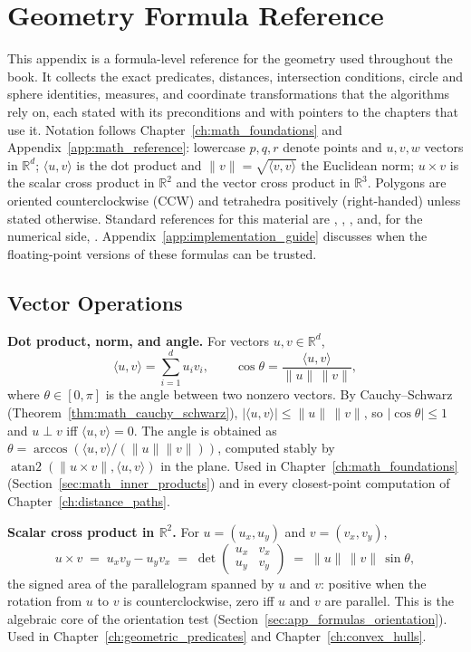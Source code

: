 \chapter{Geometry Formula Reference}
\label{app:geometry_formulas}

This appendix is a formula-level reference for the geometry used throughout
the book. It collects the exact predicates, distances, intersection
conditions, circle and sphere identities, measures, and coordinate
transformations that the algorithms rely on, each stated with its
preconditions and with pointers to the chapters that use it. Notation
follows Chapter~\ref{ch:math_foundations} and Appendix~\ref{app:math_reference}:
lowercase $p,q,r$ denote points and $u,v,w$ vectors in $\mathbb{R}^d$;
$\langle u,v\rangle$ is the dot product and $\|v\| = \sqrt{\langle v,v\rangle}$
the Euclidean norm; $u\times v$ is the scalar cross product in
$\mathbb{R}^2$ and the vector cross product in $\mathbb{R}^3$. Polygons are
oriented counterclockwise (CCW) and tetrahedra positively (right-handed)
unless stated otherwise. Standard references for this material are
\cite{deberg2008}, \cite{preparata1985}, \cite{weisstein2004}, and, for the
numerical side, \cite{higham2002}. Appendix~\ref{app:implementation_guide}
discusses when the floating-point versions of these formulas can be trusted.

\section{Vector Operations}
\label{sec:app_formulas_vectors}

\medskip\noindent\textbf{Dot product, norm, and angle.}
For vectors $u,v \in \mathbb{R}^d$,
\[
  \langle u, v\rangle = \sum_{i=1}^d u_i v_i,
  \qquad
  \cos\theta = \frac{\langle u,v\rangle}{\|u\|\,\|v\|},
\]
where $\theta \in [0,\pi]$ is the angle between two nonzero vectors. By
Cauchy--Schwarz (Theorem~\ref{thm:math_cauchy_schwarz}),
$|\langle u,v\rangle| \le \|u\|\,\|v\|$, so $|\cos\theta|\le 1$ and
$u \perp v$ iff $\langle u,v\rangle = 0$. The angle is obtained as
$\theta = \arccos(\langle u,v\rangle / (\|u\|\|v\|))$, computed stably by
$\operatorname{atan2}(\|u\times v\|, \langle u,v\rangle)$ in the plane.
Used in Chapter~\ref{ch:math_foundations} (Section~\ref{sec:math_inner_products})
and in every closest-point computation of Chapter~\ref{ch:distance_paths}.

\medskip\noindent\textbf{Scalar cross product in $\mathbb{R}^2$.}
For $u = (u_x, u_y)$ and $v = (v_x, v_y)$,
\[
  u\times v \;=\; u_x v_y - u_y v_x
  \;=\; \det\begin{pmatrix} u_x & v_x \\ u_y & v_y \end{pmatrix}
  \;=\; \|u\|\,\|v\|\,\sin\theta,
\]
the signed area of the parallelogram spanned by $u$ and $v$: positive when
the rotation from $u$ to $v$ is counterclockwise, zero iff $u$ and $v$ are
parallel. This is the algebraic core of the orientation test
(Section~\ref{sec:app_formulas_orientation}). Used in
Chapter~\ref{ch:geometric_predicates} and Chapter~\ref{ch:convex_hulls}.

